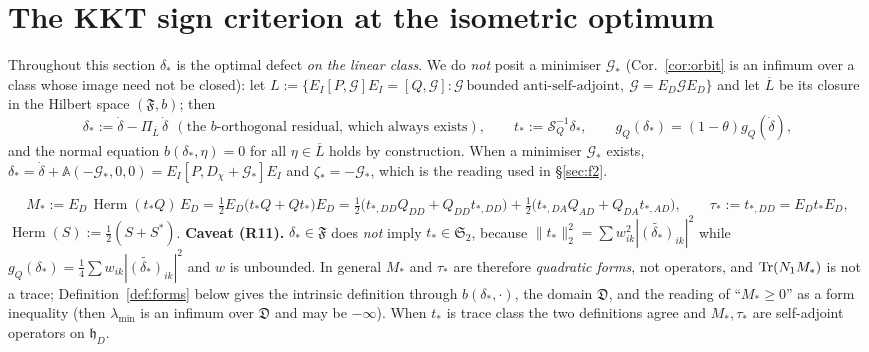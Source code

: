 \documentclass[11pt]{article}
\newcommand{\hh}{\mathfrak h}
\newcommand{\Stwo}{\mathfrak S_2}
\newcommand{\Herm}{\operatorname{Herm}}
\newcommand{\SLD}{\mathcal S_Q}
\newcommand{\Aop}{\mathbb A}
\begin{document}
\section{The KKT sign criterion at the isometric optimum}\label{sec:kkt}


Throughout this section $\delta_*$ is the optimal defect \emph{on the linear class}.  We do
\emph{not} posit a minimiser $\mathcal G_*$ (Cor.~\ref{cor:orbit} is an infimum over a class
whose image need not be closed): let
$L:=\{E_I[P,\mathcal G]E_I=[Q,\mathcal G]:\mathcal G\ \text{bounded anti-self-adjoint},\
\mathcal G=E_D\mathcal GE_D\}$ and let $\overline L$ be its closure in the Hilbert space
$(\mathfrak F,b)$; then
\begin{equation}\label{eq:deltastar}
 \delta_*:=\dot\delta-\Pi_{\overline L}\,\dot\delta\ \ (\text{the $b$-orthogonal residual, which always exists}),
 \qquad t_*:=\SLD^{-1}\delta_*,\qquad g_Q(\delta_*)=(1-\theta)g_Q(\dot\delta),
\end{equation}
and the normal equation $b(\delta_*,\eta)=0$ for all $\eta\in\overline L$ holds by
construction.  When a minimiser $\mathcal G_*$ exists,
$\delta_*=\dot\delta+\Aop(-\mathcal G_*,0,0)=E_I[P,D_\chi+\mathcal G_*]E_I$ and
$\zeta_*=-\mathcal G_*$, which is the reading used in \S\ref{sec:f2}.

\begin{definition}\label{def:M}
\begin{equation}\label{eq:Mdef}
 M_*:=E_D\,\Herm(t_*Q)\,E_D=\tfrac12E_D\bigl(t_*Q+Qt_*\bigr)E_D
  =\tfrac12\bigl(t_{*,DD}Q_{DD}+Q_{DD}t_{*,DD}\bigr)
   +\tfrac12\bigl(t_{*,DA}Q_{AD}+Q_{DA}t_{*,AD}\bigr),
 \qquad \tau_*:=t_{*,DD}=E_Dt_*E_D,
\end{equation}
$\Herm(S):=\frac12(S+S^*)$.  \textbf{Caveat (R11).}  $\delta_*\in\mathfrak F$ does
\emph{not} imply $t_*\in\Stwo$, because $\|t_*\|_2^2=\sum w_{ik}^2|\widetilde{(\delta_*)}_{ik}|^2$
while $g_Q(\delta_*)=\frac14\sum w_{ik}|\widetilde{(\delta_*)}_{ik}|^2$ and $w$ is unbounded.
In general $M_*$ and $\tau_*$ are therefore \emph{quadratic forms}, not operators, and
$\operatorname{Tr}(N_1M_*)$ is not a trace; Definition~\ref{def:forms} below gives the intrinsic
definition through $b(\delta_*,\cdot)$, the domain $\mathfrak D$, and the reading of
``$M_*\ge0$'' as a form inequality (then $\lambda_{\min}$ is an infimum over $\mathfrak D$
and may be $-\infty$).  When $t_*$ is trace class the two definitions agree and
$M_*,\tau_*$ are self-adjoint operators on $\hh_D$.
\end{definition}
\end{document}

